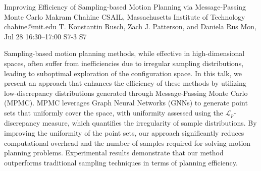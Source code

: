 \documentclass[12pt,lettersize,oneside]{book} %
\begin{document}
\begin{talk}
  {Improving Efficiency of Sampling-based Motion Planning via Message-Passing Monte Carlo}%
  {Makram Chahine}%
  {CSAIL, Massachusetts Institute of Technology}%
  {chahine@mit.edu}%
  {T. Konstantin Rusch, Zach J. Patterson, and Daniela Rus}%
  {}%
  {Mon, Jul 28 16:30--17:00}%
  {S7-3}%
  {S7}%
  
    
   
Sampling-based motion planning methods, while effective in high-dimensional spaces, often suffer from inefficiencies due to irregular sampling distributions, leading to suboptimal exploration of the configuration space. In this talk, we present an approach that enhances the efficiency of these methods by utilizing low-discrepancy distributions generated through Message-Passing Monte Carlo (MPMC). MPMC leverages Graph Neural Networks (GNNs) to generate point sets that uniformly cover the space, with uniformity assessed using the $\mathcal{L}_p$-discrepancy measure, which quantifies the irregularity of sample distributions. By improving the uniformity of the point sets, our approach significantly reduces computational overhead and the number of samples required for solving motion planning problems. Experimental results demonstrate that our method outperforms traditional sampling techniques in terms of planning efficiency.

\medskip


\end{talk}
\end{document}
